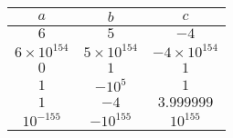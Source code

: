 \documentclass{article}
\begin{document}
\begin{enumerate}
\begin{enumerate}
\begin{tabular}{ccc}
$a$ & $b$ & $c$ \\
\hline
$6$ & $5$ & $-4$ \\
$6 \times 10^{154}$ & $5 \times 10^{154}$ & $-4 \times 10^{154}$ \\
$0$ & $1$ & $1$ \\
$1$ & $-10^5$ & $1$ \\
$1$ & $-4$ & $3.999999$ \\
$10^{-155}$ & $-10^{155}$ & $10^{155}$ 
\end{tabular}

\end{enumerate}
\end{enumerate}
\end{document}
